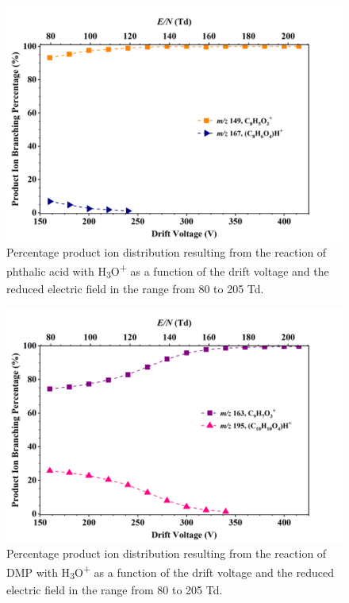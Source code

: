 {} %



\begin{figure}
\centering
\includegraphics[height=0.4\textheight]{pics/Pacid-BR.png}
\caption{Percentage product ion distribution resulting from the reaction of phthalic acid with H\textsubscript{3}O\textsuperscript{+} as a function of the drift voltage and the reduced electric field in the range from 80 to 205 Td.}
\label{fig:PAcid}
\end{figure}


\begin{figure}
\centering
\includegraphics[height=0.4\textheight]{pics/DMP-BR.png}
\caption{Percentage product ion distribution resulting from the reaction of DMP with H\textsubscript{3}O\textsuperscript{+} as a function of the drift voltage and the reduced electric field in the range from 80 to 205 Td.}
\label{fig:DMP_fs}
\end{figure}



